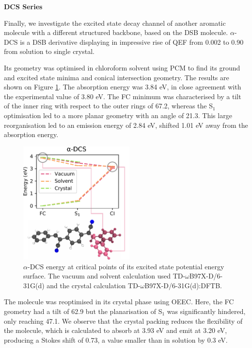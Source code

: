 \textbf{DCS Series}

Finally, we investigate the excited state decay channel of another aromatic molecule with a different structured backbone, based on the DSB molecule. $\alpha$-DCS is a DSB derivative displaying in impressive rise of QEF from 0.002 to 0.90 from solution to single crystal.\cite{Shi2017}

Its geometry was optimised in chloroform solvent using PCM to find its ground and excited state minima and conical intersection geometry. The results are shown on Figure \ref{fig:adcs}. The absorption energy was 3.84 eV, in close agreement with the experimental value of 3.80 eV. The FC minimum was characterised by a tilt of the inner ring with respect to the outer rings of 67.2\degree{}, whereas the S$_1$ optimisation led to a more planar geometry with an angle of 21.3\degree{}. This large reorganisation led to an emission energy of 2.84 eV, shifted 1.01 eV away from the absorption energy.

\begin{figure}
\centering
\includegraphics[width=5.8cm]{Chapters/7Applications/adcs.pdf}
\caption{$\alpha$-DCS energy at critical points of its excited state potential energy surface. The vacuum and solvent calculation used TD-$\omega$B97X-D/6-31G(d) and the crystal calculation TD-$\omega$B97X-D/6-31G(d):DFTB.}
\label{fig:adcs}
\end{figure}

The molecule was reoptimised in its crystal phase using OEEC. Here, the FC geometry had a tilt of 62.9\degree{} but the planarisation of S$_1$ was significantly hindered, only reaching 47.1\degree{}. We observe that the crystal packing reduces the flexibility of the molecule, which is calculated to absorb at 3.93 eV and emit at 3.20 eV, producing a Stokes shift of 0.73, a value smaller than in solution by 0.3 eV.

